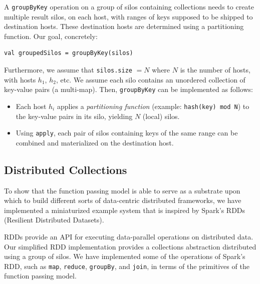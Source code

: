 \documentclass{jfp1}
\begin{document}
A \verb|groupByKey| operation on a group of silos containing collections needs
to create multiple result silos, on each host, with ranges of keys supposed to
be shipped to destination hosts. These destination hosts are determined using a
partitioning function. Our goal, concretely:

\begin{lstlisting}
val groupedSilos = groupByKey(silos)
\end{lstlisting}
\noindent
Furthermore, we assume that \verb|silos.size| $= N$ where $N$ is the number of
hosts, with hosts $h_1$, $h_2$, etc. We assume each silo contains an unordered
collection of key-value pairs (a multi-map). Then, \verb|groupByKey| can be
implemented as follows:

\begin{itemize}
  \item Each host $h_i$ applies a {\em partitioning function} (example:
    \texttt{hash(key) mod N}) to the key-value pairs in its silo, yielding $N$
    (local) silos.

  \item Using \verb|apply|, each pair of silos containing keys of the same
    range can be combined and materialized on the destination host.
\end{itemize}


\subsection{Distributed Collections}\label{sec:rdd}

To show that the function passing model is able to serve as a
substrate upon which to build different sorts of data-centric
distributed frameworks, we have implemented a miniaturized example
system that is inspired by Spark's RDDs (Resilient Distributed
Datasets).

RDDs provide an API for executing data-parallel operations on
distributed data. Our simplified RDD implementation provides a
collections abstraction distributed using a group of silos. We have
implemented some of the operations of Spark's RDD, such as \verb|map|,
\verb|reduce|, \verb|groupBy|, and \verb|join|, in terms of the
primitives of the function passing model.
\end{document}
